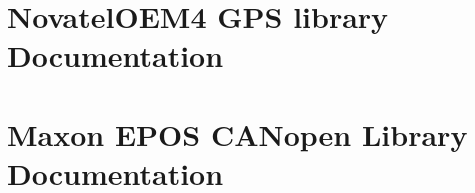 \documentclass[10pt,a4paper]{report}
\begin{document}
\clearpage

%
\appendix

\renewcommand{\thepage}{\thechapter.\arabic{page}}
%
\setcounter{page}{1}
\chapter{NovatelOEM4 GPS library Documentation}
\cleardoublepage
\pagestyle{empty}
\newlength{\originalVOffset}
\newlength{\originalHOffset}
\setlength{\originalVOffset}{\voffset}   
\setlength{\originalHOffset}{\hoffset}

\setlength{\voffset}{0cm}
\setlength{\hoffset}{0cm}
\label{appendix:novatel}

\cleardoublepage

\setlength{\voffset}{\originalVOffset}
\setlength{\hoffset}{\originalHOffset}
\chapter{Maxon EPOS CANopen Library Documentation}
\cleardoublepage
\setlength{\voffset}{0cm}
\setlength{\hoffset}{0cm}
\label{appendix:maxon}

\setlength{\voffset}{\originalVOffset}
\setlength{\hoffset}{\originalHOffset}
\cleardoublepage

%

%


\end{document}
